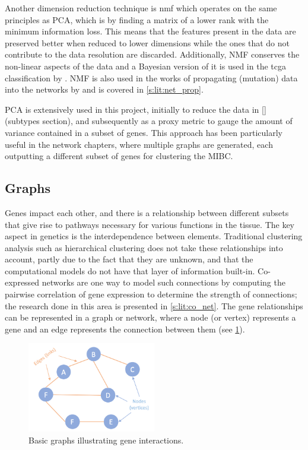Another dimension reduction technique is \acrfull{nmf} which operates on the same principles as PCA, which is by finding a matrix of a lower rank with the minimum information loss. This means that the features present in the data are preserved better when reduced to lower dimensions while the ones that do not contribute to the data resolution are discarded. Additionally, NMF conserves the non-linear aspects of the data and a Bayesian version of it is used in the \acrfull{tcga} classification by \citet{Robertson2017-mg}. NMF is also  used in the works of propagating (mutation) data into the networks by \citet{Yang2016-dm, Cai2008-fv} and is covered in \cref{s:lit:net_prop}.

PCA is extensively used in this project, initially to reduce the data in \ref{} (subtypes section), and subsequently as a proxy metric to gauge the amount of variance contained in a subset of genes. This approach has been particularly useful in the network chapters, where multiple graphs are generated, each outputting a different subset of genes for clustering the MIBC.


\subsection{Graphs} \label{s:lit:graph_overview}

Genes impact each other, and there is a relationship between different subsets that give rise to pathways necessary for various functions in the tissue. The key aspect in genetics is the interdependence between elements. Traditional clustering analysis such as hierarchical clustering does not take these relationships into account, partly due to the fact that they are unknown, and that the computational models do not have that layer of information built-in. Co-expressed networks are one way to model such connections by computing the pairwise correlation of gene expression to determine the strength of connections; the research done in this area is presented in \cref{s:lit:co_net}. The gene relationships can be represented in a graph or network, where a node (or vertex) represents a gene and an edge represents the connection between them (see \cref{fig:graphs_basic}).

\begin{figure}[!htb]
  \centering\includegraphics[width=0.5\textwidth,height=0.5\textheight,keepaspectratio]{Sections/Lit_review/Resources/basic_graphs.png}
    \caption{Basic graphs illustrating gene interactions.}
    \label{fig:graphs_basic}
\end{figure}

